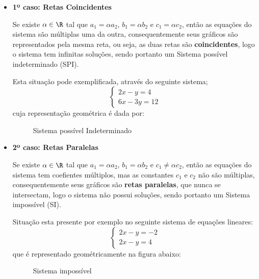  \begin{itemize}
  \item \textbf{1º caso: Retas Coincidentes}


 Se existe $\alpha \in \R$ tal que $a_1= \alpha a_2$, $b_1= \alpha b_2$ e $c_1= \alpha c_2$, então as equações do sistema são múltiplas uma da outra, consequentemente seus gráficos são representados pela mesma reta, ou seja, as duas retas são \textbf{coincidentes}, logo o sistema tem infinitas soluções, sendo portanto um {\color{red} Sistema possível indeterminado (SPI)}.

 \begin{exem}
 Esta situação pode exemplificada, através do seguinte sistema;
 \[\begin{cases}
    2x - y= 4 \\
    6x - 3y= 12
   \end{cases}
\]
cuja representação geométrica é dada por:

 \begin{figure}[H]
 \centering
    \caption{Sistema possível Indeterminado}
  \end{figure}
 \end{exem}

 \item \textbf{2º caso: Retas Paralelas}

 Se existe $\alpha \in \R$ tal que $a_1= \alpha a_2$, $b_1= \alpha b_2$ e $c_1 \neq \alpha c_2$, então as equações do sistema tem coefientes múltiplos, mas as constantes $c_1$ e $c_2$ não são múltiplas, consequentemente seus gráficos são \textbf{retas paralelas}, que nunca se intersectam, logo o sistema não possui soluções, sendo portanto um {\color{red} Sistema impossível (SI)}.

\begin{exem}
 Situação esta presente por exemplo no seguinte sistema de equações lineares:
 \[\begin{cases}
    2x - y= -2 \\
    2x - y= 4
   \end{cases}
\]
que é representado geométricamente na figura abaixo:

 \begin{figure}[H]
 \centering
    \caption{Sistema impossível}
  \end{figure}
 \end{exem}


\end{itemize}

